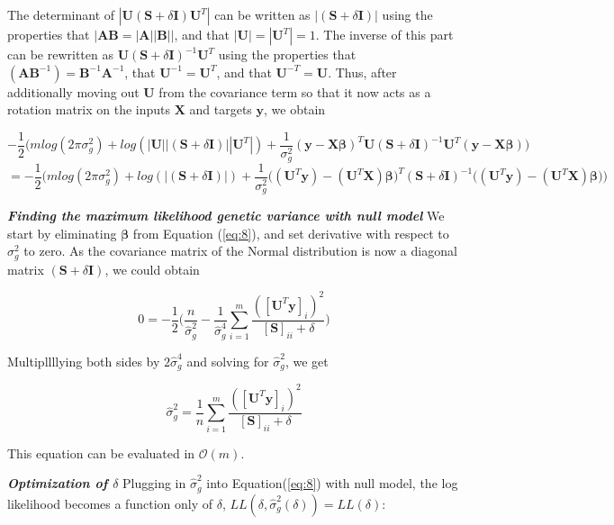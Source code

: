 \documentclass[11pt]{article}
\theoremstyle{plain}
\theoremstyle{definition}
\theoremstyle{remark}
\begin{document}
The determinant of $|\bm{U}(\bm{S}+\delta{\bm{I}})\bm{U}^T|$ can be written as $|(\bm{S}+\delta{\bm{I}})|$ using the properties that $|\bm{AB}=|\bm{A}||\bm{B}||$, and that $|\bm{U}|=|\bm{U}^T|=1$. The inverse of this part can be rewritten as $\bm{U}(\bm{S}+\delta\bm{I})^{-1}\bm{U}^T$ using the properties that $(\bm{AB}^{-1})=\bm{B}^{-1}\bm{A}^{-1}$, that $\bm{U}^{-1}=\bm{U}^T$, and that $\bm{U}^{-T}=\bm{U}$. Thus, after additionally moving out $\bm{U}$ from the covariance term so that it now acts as a rotation matrix on the inputs $\bm{X}$ and targets $\bm{y}$, we obtain

\begin{equation*}
-\frac{1}{2}\Big(mlog(2\pi\sigma_g^2)+log(|\bm{U}||(\bm{S}+\delta\bm{I})||\bm{U}^T|)+\frac{1}{\sigma_g^2}(\bm{y}-\bm{X\beta})^T\bm{U}(\bm{S}+\delta{\bm{I}})^{-1}\bm{U}^T(\bm{y}-\bm{X\beta})\Big)
\end{equation*}
\begin{equation}
\label{eq:8}
=-\frac{1}{2}\Big(mlog(2\pi\sigma_g^2)+log(|(\bm{S}+\delta\bm{I})|)+\frac{1}{\sigma_g^2}\big((\bm{U}^T\bm{y})-(\bm{U}^T\bm{X})\bm\beta\big)^T(\bm{S}+\delta{\bm{I}})^{-1}\big((\bm{U}^T\bm{y})-(\bm{U}^T\bm{X})\bm\beta\big)\Big)
\end{equation}

\textbf{\em Finding the maximum likelihood genetic variance with null model} We start by eliminating $\bm\beta$ from Equation (\ref{eq:8}), and set derivative with respect to $\sigma_g^2$ to zero. As the covariance matrix of the Normal distribution is now a diagonal matrix $(\bm{S}+\delta\bm{I})$, we could obtain

\begin{equation*}
0=-\frac{1}{2}\Bigg(\frac{n}{\hat{\sigma}_g^2}-\frac{1}{\hat{\sigma}_g^4}\sum_{i=1}^m\frac{([\bm{U}^T\bm{y}]_i)^2}{[\bm{S}]_{ii}+\delta} \Bigg)
\end{equation*}

Multipllllying both sides by $2\hat{\sigma}_g^4$ and solving for $\hat{\sigma}_g^2$, we get

\begin{equation*}
\hat{\sigma}_g^2=\frac{1}{n}\sum_{i=1}^m\frac{([\bm{U}^T\bm{y}]_i)^2}{[\bm{S}]_{ii}+\delta}
\end{equation*}

This equation can be evaluated in $\mathcal{O}(m)$.

\textbf{\em Optimization of $\delta$} Plugging in $\hat{\sigma}_g^2$ into Equation(\ref{eq:8}) with null model, the log likelihood becomes a function only of $\delta$, $LL(\delta,\hat{\sigma}_g^2(\delta))=LL(\delta)$:
\end{document}
